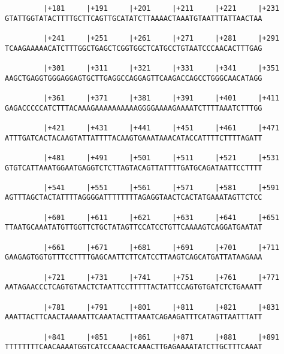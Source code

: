 \documentclass{article}
\begin{document}
\begin{Verbatim}
         |+181     |+191     |+201     |+211     |+221     |+231
GTATTGGTATACTTTTGCTTCAGTTGCATATCTTAAAACTAAATGTAATTTATTAACTAA
                                                            
         |+241     |+251     |+261     |+271     |+281     |+291
TCAAGAAAAACATCTTTGGCTGAGCTCGGTGGCTCATGCCTGTAATCCCAACACTTTGAG
                                                            
         |+301     |+311     |+321     |+331     |+341     |+351
AAGCTGAGGTGGGAGGAGTGCTTGAGGCCAGGAGTTCAAGACCAGCCTGGGCAACATAGG
                                                            
         |+361     |+371     |+381     |+391     |+401     |+411
GAGACCCCCATCTTTACAAAGAAAAAAAAAAGGGGAAAAGAAAATCTTTTAAATCTTTGG
                                                            
         |+421     |+431     |+441     |+451     |+461     |+471
ATTTGATCACTACAAGTATTATTTTACAAGTGAAATAAACATACCATTTTCTTTTAGATT
                                                            
         |+481     |+491     |+501     |+511     |+521     |+531
GTGTCATTAAATGGAATGAGGTCTCTTAGTACAGTTATTTTGATGCAGATAATTCCTTTT
                                                            
         |+541     |+551     |+561     |+571     |+581     |+591
AGTTTAGCTACTATTTTAGGGGATTTTTTTTAGAGGTAACTCACTATGAAATAGTTCTCC
                                                            
         |+601     |+611     |+621     |+631     |+641     |+651
TTAATGCAAATATGTTGGTTCTGCTATAGTTCCATCCTGTTCAAAAGTCAGGATGAATAT
                                                            
         |+661     |+671     |+681     |+691     |+701     |+711
GAAGAGTGGTGTTTCCTTTTGAGCAATTCTTCATCCTTAAGTCAGCATGATTATAAGAAA
                                                            
         |+721     |+731     |+741     |+751     |+761     |+771
AATAGAACCCTCAGTGTAACTCTAATTCCTTTTTACTATTCCAGTGTGATCTCTGAAATT
                                                            
         |+781     |+791     |+801     |+811     |+821     |+831
AAATTACTTCAACTAAAAATTCAAATACTTTAAATCAGAAGATTTCATAGTTAATTTATT
                                                            
         |+841     |+851     |+861     |+871     |+881     |+891
TTTTTTTTCAACAAAATGGTCATCCAAACTCAAACTTGAGAAAATATCTTGCTTTCAAAT
                                                            

\end{Verbatim}
\end{document}
